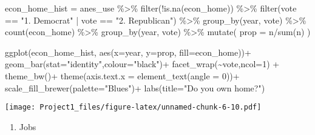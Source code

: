 \documentclass[
]{article}
\newenvironment{Shaded}{\begin{snugshade}}{\end{snugshade}}
\newcommand{\AttributeTok}[1]{\textcolor[rgb]{0.77,0.63,0.00}{#1}}
\newcommand{\DecValTok}[1]{\textcolor[rgb]{0.00,0.00,0.81}{#1}}
\newcommand{\FunctionTok}[1]{\textcolor[rgb]{0.00,0.00,0.00}{#1}}
\newcommand{\NormalTok}[1]{#1}
\newcommand{\OtherTok}[1]{\textcolor[rgb]{0.56,0.35,0.01}{#1}}
\newcommand{\SpecialCharTok}[1]{\textcolor[rgb]{0.00,0.00,0.00}{#1}}
\newcommand{\StringTok}[1]{\textcolor[rgb]{0.31,0.60,0.02}{#1}}
\providecommand{\tightlist}{%
  \setlength{\itemsep}{0pt}\setlength{\parskip}{0pt}}
\begin{document}
\begin{Shaded}
\begin{Highlighting}[]
\NormalTok{econ\_home\_hist }\OtherTok{=}\NormalTok{ anes\_use }\SpecialCharTok{\%\textgreater{}\%}
  \FunctionTok{filter}\NormalTok{(}\SpecialCharTok{!}\FunctionTok{is.na}\NormalTok{(econ\_home))  }\SpecialCharTok{\%\textgreater{}\%}
  \FunctionTok{filter}\NormalTok{(vote }\SpecialCharTok{==} \StringTok{"1. Democrat"} \SpecialCharTok{|}\NormalTok{ vote }\SpecialCharTok{==} \StringTok{"2. Republican"}\NormalTok{) }\SpecialCharTok{\%\textgreater{}\%}
  \FunctionTok{group\_by}\NormalTok{(year, vote) }\SpecialCharTok{\%\textgreater{}\%}
  \FunctionTok{count}\NormalTok{(econ\_home) }\SpecialCharTok{\%\textgreater{}\%}
  \FunctionTok{group\_by}\NormalTok{(year, vote) }\SpecialCharTok{\%\textgreater{}\%}
  \FunctionTok{mutate}\NormalTok{(}
    \AttributeTok{prop =}\NormalTok{ n}\SpecialCharTok{/}\FunctionTok{sum}\NormalTok{(n)}
\NormalTok{  )}
 

\FunctionTok{ggplot}\NormalTok{(econ\_home\_hist,}
       \FunctionTok{aes}\NormalTok{(}\AttributeTok{x=}\NormalTok{year, }\AttributeTok{y=}\NormalTok{prop, }\AttributeTok{fill=}\NormalTok{econ\_home))}\SpecialCharTok{+}
  \FunctionTok{geom\_bar}\NormalTok{(}\AttributeTok{stat=}\StringTok{"identity"}\NormalTok{,}\AttributeTok{colour=}\StringTok{"black"}\NormalTok{)}\SpecialCharTok{+}
  \FunctionTok{facet\_wrap}\NormalTok{(}\SpecialCharTok{\textasciitilde{}}\NormalTok{vote,}\AttributeTok{ncol=}\DecValTok{1}\NormalTok{) }\SpecialCharTok{+}
  \FunctionTok{theme\_bw}\NormalTok{()}\SpecialCharTok{+}
  \FunctionTok{theme}\NormalTok{(}\AttributeTok{axis.text.x =} \FunctionTok{element\_text}\NormalTok{(}\AttributeTok{angle =} \DecValTok{0}\NormalTok{))}\SpecialCharTok{+}
  \FunctionTok{scale\_fill\_brewer}\NormalTok{(}\AttributeTok{palette=}\StringTok{"Blues"}\NormalTok{)}\SpecialCharTok{+}
  \FunctionTok{labs}\NormalTok{(}\AttributeTok{title=}\StringTok{"Do you own home?"}\NormalTok{)}
\end{Highlighting}
\end{Shaded}

\texttt{[image: Project1\_files/figure-latex/unnamed-chunk-6-10.pdf]}

\begin{enumerate}
\def\labelenumi{\arabic{enumi}.}
\setcounter{enumi}{1}
\tightlist
\item
  Jobs
\end{enumerate}
\end{document}
